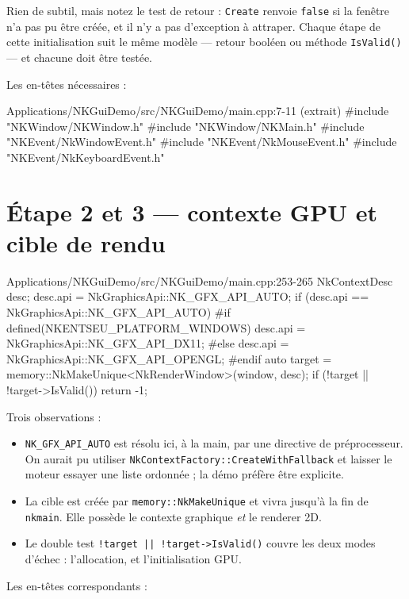 Rien de subtil, mais notez le test de retour : \texttt{Create} renvoie
\texttt{false} si la fenêtre n'a pas pu être créée, et il n'y a pas d'exception à
attraper. Chaque étape de cette initialisation suit le même modèle — retour
booléen ou méthode \texttt{IsValid()} — et chacune doit être testée.

Les en-têtes nécessaires :

\begin{nkcode}{Applications/NKGuiDemo/src/NKGuiDemo/main.cpp:7-11 (extrait)}
#include "NKWindow/NKWindow.h"
#include "NKWindow/NKMain.h"
#include "NKEvent/NkWindowEvent.h"
#include "NKEvent/NkMouseEvent.h"
#include "NKEvent/NkKeyboardEvent.h"
\end{nkcode}

\section{Étape 2 et 3 — contexte GPU et cible de rendu}

\begin{nkcode}{Applications/NKGuiDemo/src/NKGuiDemo/main.cpp:253-265}
    NkContextDesc desc;
    desc.api = NkGraphicsApi::NK_GFX_API_AUTO;
    if (desc.api == NkGraphicsApi::NK_GFX_API_AUTO) {
#if defined(NKENTSEU_PLATFORM_WINDOWS)
        desc.api = NkGraphicsApi::NK_GFX_API_DX11;
#else
        desc.api = NkGraphicsApi::NK_GFX_API_OPENGL;
#endif
    }
    auto target = memory::NkMakeUnique<NkRenderWindow>(window, desc);
    if (!target || !target->IsValid())
        return -1;
\end{nkcode}

Trois observations :

\begin{itemize}
  \item \texttt{NK\_GFX\_API\_AUTO} est résolu ici, à la main, par une directive
        de préprocesseur. On aurait pu utiliser
        \texttt{NkContextFactory::CreateWithFallback} et laisser le moteur
        essayer une liste ordonnée ; la démo préfère être explicite.
  \item La cible est créée par \texttt{memory::NkMakeUnique} et vivra jusqu'à la
        fin de \texttt{nkmain}. Elle possède le contexte graphique \emph{et} le
        renderer 2D.
  \item Le double test \texttt{!target || !target->IsValid()} couvre les deux
        modes d'échec : l'allocation, et l'initialisation GPU.
\end{itemize}

Les en-têtes correspondants :


